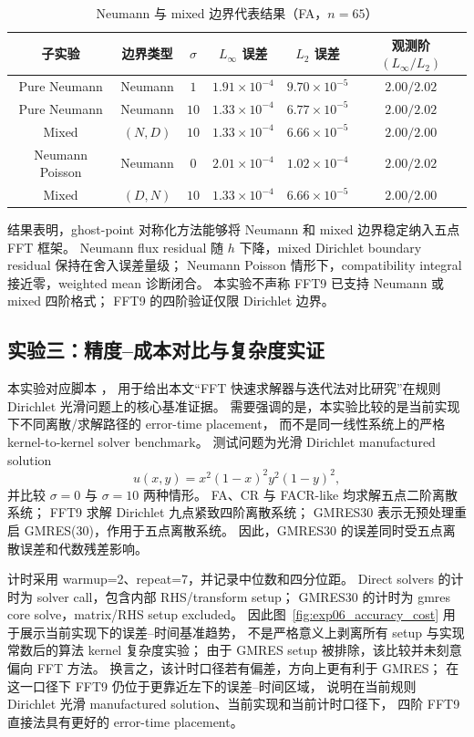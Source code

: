 \begin{table}[htbp]
\centering
\caption{Neumann 与 mixed 边界代表结果（FA，$n=65$）}
\label{tab:exp03_neumann_mixed}
\small
\begin{tabular}{cccccc}
\toprule
子实验 & 边界类型 & $\sigma$ & $L_\infty$ 误差 & $L_2$ 误差 & 观测阶 $(L_\infty/L_2)$ \\
\midrule
Pure Neumann & Neumann & $1$  & $1.91\times10^{-4}$ & $9.70\times10^{-5}$ & $2.00/2.02$ \\
Pure Neumann & Neumann & $10$ & $1.33\times10^{-4}$ & $6.77\times10^{-5}$ & $2.00/2.02$ \\
Mixed        & $(N,D)$ & $10$ & $1.33\times10^{-4}$ & $6.66\times10^{-5}$ & $2.00/2.00$ \\
Neumann Poisson & Neumann & $0$ & $2.01\times10^{-4}$ & $1.02\times10^{-4}$ & $2.00/2.02$ \\
Mixed        & $(D,N)$ & $10$ & $1.33\times10^{-4}$ & $6.66\times10^{-5}$ & $2.00/2.00$ \\
\bottomrule
\end{tabular}
\end{table}

结果表明，ghost-point 对称化方法能够将 Neumann 和 mixed 边界稳定纳入五点 FFT 框架。
Neumann flux residual 随 $h$ 下降，mixed Dirichlet boundary residual 保持在舍入误差量级；
Neumann Poisson 情形下，compatibility integral 接近零，weighted mean 诊断闭合。
本实验不声称 FFT9 已支持 Neumann 或 mixed 四阶格式；
FFT9 的四阶验证仅限 Dirichlet 边界。

\subsection{实验三：精度--成本对比与复杂度实证}

本实验对应脚本 ，
用于给出本文“FFT 快速求解器与迭代法对比研究”在规则 Dirichlet 光滑问题上的核心基准证据。
需要强调的是，本实验比较的是当前实现下不同离散/求解路径的 error-time placement，
而不是同一线性系统上的严格 kernel-to-kernel solver benchmark。
测试问题为光滑 Dirichlet manufactured solution
\begin{equation}
  u(x,y)=x^2(1-x)^2y^2(1-y)^2,
\end{equation}
并比较 $\sigma=0$ 与 $\sigma=10$ 两种情形。
FA、CR 与 FACR-like 均求解五点二阶离散系统；
FFT9 求解 Dirichlet 九点紧致四阶离散系统；
GMRES30 表示无预处理重启 GMRES(30)，作用于五点离散系统。
因此，GMRES30 的误差同时受五点离散误差和代数残差影响。

计时采用 warmup=2、repeat=7，并记录中位数和四分位距。
Direct solvers 的计时为 solver call，包含内部 RHS/transform setup；
GMRES30 的计时为 gmres core solve，matrix/RHS setup excluded。
因此图~\ref{fig:exp06_accuracy_cost} 用于展示当前实现下的误差--时间基准趋势，
不是严格意义上剥离所有 setup 与实现常数后的算法 kernel 复杂度实验；
由于 GMRES setup 被排除，该比较并未刻意偏向 FFT 方法。
换言之，该计时口径若有偏差，方向上更有利于 GMRES；
在这一口径下 FFT9 仍位于更靠近左下的误差--时间区域，
说明在当前规则 Dirichlet 光滑 manufactured solution、当前实现和当前计时口径下，
四阶 FFT9 直接法具有更好的 error-time placement。

